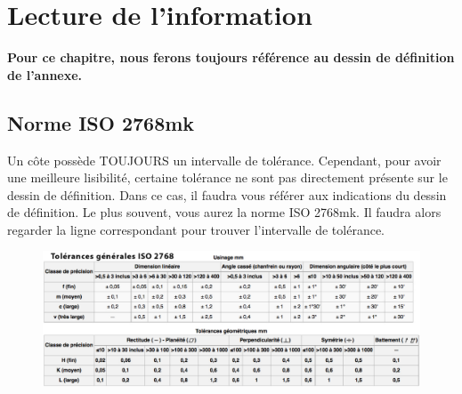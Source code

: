 \documentclass[
	11pt, %
	fleqn, %
	a4paper, %
]{LegrandOrangeBook}
\begin{document}

\chapterspaceabove{6.25cm} %
\chapterspacebelow{7.5cm} %


\chapter{Lecture de l'information}

\textbf{Pour ce chapitre, nous ferons toujours référence au dessin de définition de l'annexe.}

\section{Norme ISO 2768mk}
Un côte possède TOUJOURS un intervalle de tolérance. Cependant, pour avoir une meilleure lisibilité, certaine tolérance ne sont pas directement présente sur le dessin de définition. Dans ce cas, il faudra vous référer aux indications du dessin de définition. Le plus souvent, vous aurez la norme ISO 2768mk. Il faudra alors regarder la ligne correspondant pour trouver l'intervalle de tolérance.
 \begin{figure}[H] %
	\centering %
	\includegraphics[width=1\textwidth]{Images/T13.PNG} %

	\label{fig:placeholder} %
\end{figure}
\end{document}
